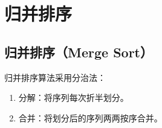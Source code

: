 \newpage

\section{归并排序}

\subsection{归并排序（Merge Sort）}

归并排序算法采用分治法：

\begin{enumerate}
    \item 分解：将序列每次折半划分。
    \item 合并：将划分后的序列两两按序合并。
\end{enumerate}

